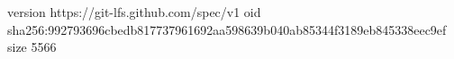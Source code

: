 version https://git-lfs.github.com/spec/v1
oid sha256:992793696cbedb817737961692aa598639b040ab85344f3189eb845338eec9ef
size 5566

